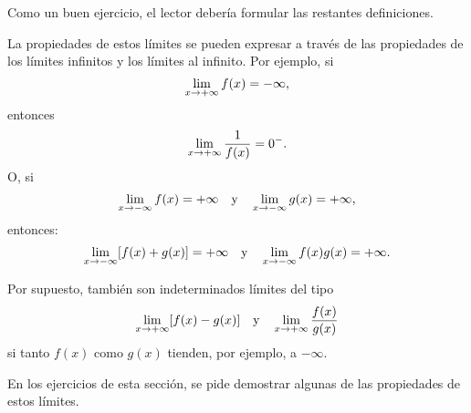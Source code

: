 Como un buen ejercicio, el lector debería formular las restantes definiciones.


La propiedades de estos límites se pueden expresar a través de las propiedades de los límites
infinitos y los límites al infinito. Por ejemplo, si
\[
\limjc{f(x)}{x}{+\infty} = -\infty,
\]
entonces
\[
\limjc{\frac{1}{f(x)}}{x}{+\infty} = 0^-.
\]
O, si
\[
\limjc{f(x)}{x}{-\infty} = +\infty \yjc \limjc{g(x)}{x}{-\infty} = +\infty,
\]
entonces:
\[
\limjc{[f(x)+g(x)]}{x}{-\infty} = +\infty \yjc \limjc{f(x)g(x)}{x}{-\infty} = +\infty.
\]

Por supuesto, también son indeterminados límites del tipo
\[
\limjc{[f(x) - g(x)]}{x}{+\infty} \yjc \limjc{\frac{f(x)}{g(x)}}{x}{+\infty}
\]
si tanto $f(x)$ como $g(x)$ tienden, por ejemplo, a $-\infty$.

En los ejercicios de esta sección, se pide demostrar algunas de las propiedades de estos límites.

\newpage
